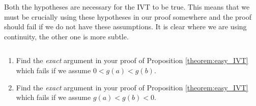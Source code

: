 Both the hypotheses are necessary for the IVT to be true.
This means that we must be crucially using these hypotheses in our proof somewhere and the proof should fail if we do not have these assumptions. It is clear where we are using continuity, the other one is more subtle.
\begin{exercise}$ $
	\begin{enumerate}
		\item Find the {\it exact} argument in your proof of Proposition \ref{theorem:easy_IVT} which fails if we assume $0 < g(a) < g(b)$.
		\item Find the {\it exact} argument in your proof of Proposition \ref{theorem:easy_IVT} which fails if we assume $ g(a) < g(b) < 0$.
	\end{enumerate}
\end{exercise}
